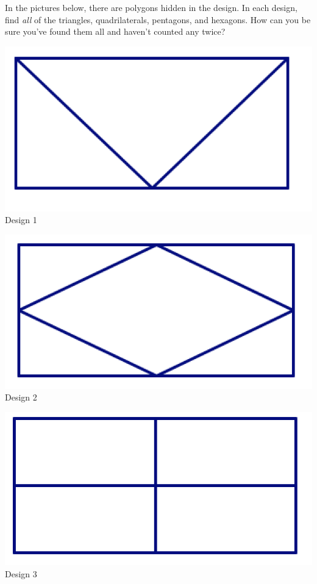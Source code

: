 \bigskip


\newpage

\begin{problem}
In the pictures below, there are polygons hidden in the design.  In each design, find \emph{all} of the triangles, quadrilaterals, pentagons, and hexagons.  How can you be sure you've found them all and haven't counted any twice?

\end{problem}

\begin{center}
\includegraphics[scale=0.65]{design1} \\
Design 1

\bigskip
\includegraphics[scale=0.65]{design2} \\
Design 2

\bigskip

\includegraphics[scale=0.65]{design3} \\
Design 3


\end{center}
